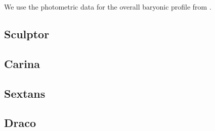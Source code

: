We use the photometric data for the overall baryonic profile from \cite{DeBoer2013}.



\subsection{Sculptor}

\subsection{Carina}

\subsection{Sextans}

\subsection{Draco}




